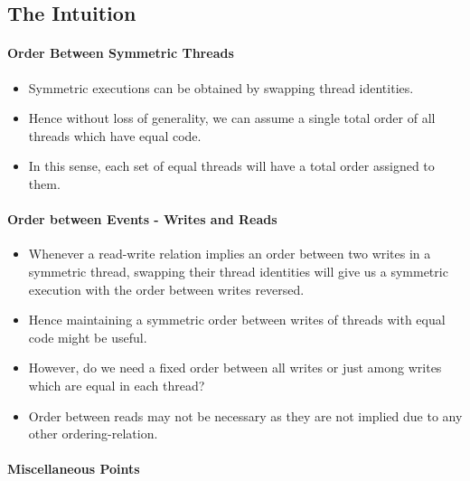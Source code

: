 \subsection{The Intuition}
    
    \paragraph{Order Between Symmetric Threads}
        \begin{itemize}
            \item Symmetric executions can be obtained by swapping thread identities.
            \item Hence without loss of generality, we can assume a single total order of all threads which have equal code.
            \item In this sense, each set of equal threads will have a total order assigned to them. 
        \end{itemize}

    \paragraph{Order between Events - Writes and Reads}
        \begin{itemize}
            \item Whenever a read-write relation implies an order between two writes in a symmetric thread, swapping their thread identities will give us a symmetric execution with the order between writes reversed.
            \item Hence maintaining a symmetric order between writes of threads with equal code might be useful. 
            \item However, do we need a fixed order between all writes or just among writes which are equal in each thread? 
            \item Order between reads may not be necessary as they are not implied due to any other ordering-relation.  
        \end{itemize}


    \paragraph{Miscellaneous Points}

